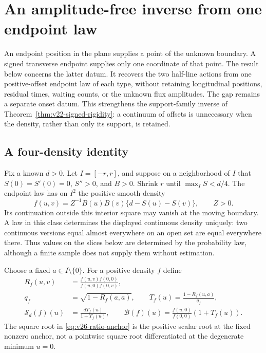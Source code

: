 \section{An amplitude-free inverse from one endpoint law}
\label{sec:v26-single-offset}

An endpoint position in the plane supplies a point of the unknown boundary.
A signed transverse endpoint supplies only one coordinate of that point.
The result below concerns the latter datum.  It recovers the two half-line
actions from one positive-offset endpoint law of each type, without retaining
longitudinal positions, residual times, waiting counts, or the unknown flux
amplitudes.  The gap remains a separate onset datum.  This strengthens the
support-family inverse of Theorem~\ref{thm:v22-signed-rigidity}: a continuum
of offsets is unnecessary when the density, rather than only its support,
is retained.

\subsection{A four-density identity}

Fix a known \(d>0\).  Let \(I=[-r,r]\), and suppose on a neighborhood of
\(I\) that \(S(0)=S'(0)=0\), \(S''>0\), and \(B>0\).  Shrink \(r\)
until \(\max_I S<d/4\).  The endpoint law has on \(I^2\) the positive
smooth density
\begin{equation}\label{eq:v26-density}
 f(u,v)=Z^{-1}B(u)B(v)\{d-S(u)-S(v)\},\qquad Z>0.
\end{equation}
Its continuation outside this interior square may vanish at the moving
boundary.  A law in this class determines the displayed continuous density
uniquely: two continuous versions equal almost everywhere on an open set
are equal everywhere there.  Thus values on the slices below are determined
by the probability law, although a finite sample does not supply them
without estimation.

Choose a fixed \(a\in I\setminus\{0\}\).  For a positive density \(f\)
define
\begin{align}
 R_f(u,v)&=\frac{f(u,v)f(0,0)}{f(u,0)f(0,v)},
                                      \label{eq:v26-density-ratio}\\
 q_f&=\sqrt{1-R_f(a,a)},\qquad
 T_f(u)=\frac{1-R_f(u,a)}{q_f},
                                      \label{eq:v26-ratio-anchor}\\
 \mathcal S_d(f)(u)&=\frac{dT_f(u)}{1+T_f(u)},\qquad
 \mathcal B(f)(u)=\frac{f(u,0)}{f(0,0)}(1+T_f(u)).
                                      \label{eq:v26-explicit-inverse}
\end{align}
The square root in \eqref{eq:v26-ratio-anchor} is the positive scalar root
at the fixed nonzero anchor, not a pointwise square root differentiated at
the degenerate minimum \(u=0\).

